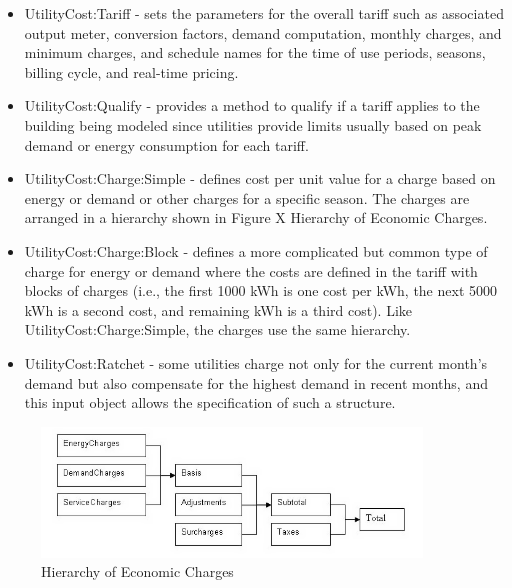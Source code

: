 \begin{itemize}
\item UtilityCost:Tariff - sets the parameters for the overall tariff such
as associated output meter, conversion factors, demand computation,
monthly charges, and minimum charges, and schedule names for the time
of use periods, seasons, billing cycle, and real-time pricing.
\item UtilityCost:Qualify - provides a method to qualify if a tariff applies
to the building being modeled since utilities provide limits usually
based on peak demand or energy consumption for each tariff.
\item UtilityCost:Charge:Simple - defines cost per unit value for a charge
based on energy or demand or other charges for a specific season.
The charges are arranged in a hierarchy shown in Figure X Hierarchy
of Economic Charges.
\item UtilityCost:Charge:Block - defines a more complicated but common type
of charge for energy or demand where the costs are defined in the
tariff with blocks of charges (i.e., the first 1000 kWh is one cost
per kWh, the next 5000 kWh is a second cost, and remaining kWh is
a third cost). Like UtilityCost:Charge:Simple, the charges use the
same hierarchy.
\item UtilityCost:Ratchet - some utilities charge not only for the current
month's demand but also compensate for the highest demand in recent
months, and this input object allows the specification of such a structure.
\end{itemize}

\begin{figure}[hbtp] 
\centering
\includegraphics[width=0.9\textwidth, height=0.9\textheight, keepaspectratio=true]{media/tariff-charges.png}
\caption{Hierarchy of Economic Charges}
\end{figure}

